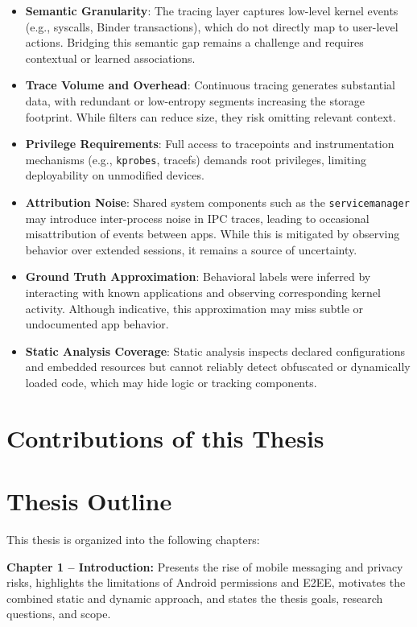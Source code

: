 \documentclass[a4paper,12pt]{report}
\begin{document}
\begin{itemize}
\item \textbf{Semantic Granularity}: The tracing layer captures low-level kernel events (e.g., syscalls, Binder transactions), which do not directly map to user-level actions. Bridging this semantic gap remains a challenge and requires contextual or learned associations.
\item \textbf{Trace Volume and Overhead}: Continuous tracing generates substantial data, with redundant or low-entropy segments increasing the storage footprint. While filters can reduce size, they risk omitting relevant context.
\item \textbf{Privilege Requirements}: Full access to tracepoints and instrumentation mechanisms (e.g., \texttt{kprobes}, tracefs) demands root privileges, limiting deployability on unmodified devices.
\item \textbf{Attribution Noise}: Shared system components such as the \texttt{servicemanager} may introduce inter-process noise in IPC traces, leading to occasional misattribution of events between apps. While this is mitigated by observing behavior over extended sessions, it remains a source of uncertainty.
\item \textbf{Ground Truth Approximation}: Behavioral labels were inferred by interacting with known applications and observing corresponding kernel activity. Although indicative, this approximation may miss subtle or undocumented app behavior.
\item \textbf{Static Analysis Coverage}: Static analysis inspects declared configurations and embedded resources but cannot reliably detect obfuscated or dynamically loaded code, which may hide logic or tracking components.
\end{itemize}
\section{Contributions of this Thesis}

\section{Thesis Outline}
This thesis is organized into the following chapters:

\textbf{Chapter 1 – Introduction:} Presents the rise of mobile messaging and privacy risks, highlights the limitations of Android permissions and E2EE, motivates the combined static and dynamic approach, and states the thesis goals, research questions, and scope.
\end{document}
